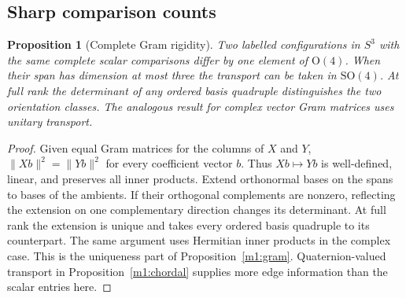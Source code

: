 \documentclass[11pt,reqno]{amsart}
\newtheorem{proposition}[theorem]{Proposition}
\theoremstyle{definition}
\theoremstyle{remark}
\numberwithin{equation}{section}
\begin{document}
\subsection{Sharp comparison counts}

\begin{proposition}[Complete Gram rigidity]\label{m8:gram}
Two labelled configurations in $S^3$ with the same complete scalar
comparisons differ by one element of $\mathrm O(4)$. When their
span has dimension at most three the transport can be taken in
$\mathrm{SO}(4)$. At full rank the determinant of any ordered basis
quadruple distinguishes the two orientation classes. The analogous
result for complex vector Gram matrices uses unitary transport.
\end{proposition}
\begin{proof}
Given equal Gram matrices for the columns of $X$ and $Y$,
$\|Xb\|^2=\|Yb\|^2$ for every coefficient vector $b$. Thus $Xb\mapsto
Yb$ is well-defined, linear, and preserves all inner products.
Extend orthonormal bases on the spans to bases of the ambients.
If their orthogonal complements are nonzero, reflecting the
extension on one complementary direction changes its determinant.
At full rank the extension is unique and takes every ordered basis
quadruple to its counterpart. The same argument uses Hermitian
inner products in the complex case. This is the uniqueness part of
Proposition~\ref{m1:gram}. Quaternion-valued transport in
Proposition~\ref{m1:chordal} supplies more edge information than the
scalar entries here.
\end{proof}
\end{document}
